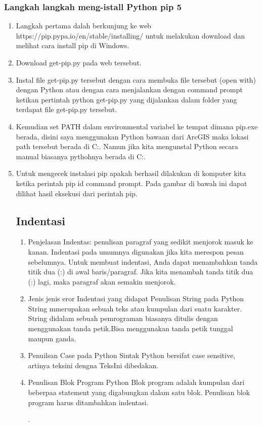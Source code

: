 \subsubsection{Langkah langkah meng-istall Python pip 5}
\begin{enumerate}
    \item Langkah pertama dalah berkunjung ke web 
https://pip.pypa.io/en/stable/installing/ untuk melakukan download dan melihat cara install pip di Windows.
    \item Download get-pip.py pada web tersebut.
    \item Instal file get-pip.py tersebut dengan cara membuka file tersebut (open with) dengan Python atau dengan cara menjalankan dengan command prompt ketikan pertintah python get-pip.py yang dijalankan dalam folder yang terdapat file get-pip.py tersebut.
    \item Kemudian set PATH dalam environmental variabel ke tempat dimana
     pip.exe
    berada, disini saya menggunakan Python bawaan dari ArcGIS maka lokasi path tersebut berada di 
    C:\Scripts.
    Namun jika kita mengunstal Python secara manual biasanya pythohnya berada di C:\Scripts.
    \item Untuk mengecek instalasi pip apakah berhasil dilakukan di komputer kita ketika perintah pip id command prompt. Pada gambar di bawah ini dapat dilihat hasil eksekusi dari perintah pip.
\subsection{Indentasi}
     \begin{enumerate}
         \item Penjelasan Indentas:
     penulisan paragraf yang sedikit menjorok masuk ke kanan. Indentasi pada umumnya digunakan jika kita merespon pesan sebelumnya. Untuk membuat indentasi, Anda dapat menambahkan tanda titik dua (:) di awal baris/paragraf. Jika kita menambah tanda titik dua (:) lagi, maka paragraf akan semakin menjorok.
     \item Jenis jenis eror Indentasi yang didapat
Penulisan String pada Python
String mmerupakan sebuah teks atau kumpulan dari suatu karakter.
String didalam sebuah pemrograman biasanya ditulis dengan menggunakan tanda petik.Bisa menggunakan tanda petik tunggal maupun ganda.
    \item Penuilsan Case pada Python
Sintak Python bersifat case sensitive, artinya teksini dengna TeksIni dibedakan.
     \item  Penulisan Blok Program Python
Blok program adalah kumpulan dari beberpaa statement yang digabungkan dalam satu blok.
Penulisan blok program harus ditambahkan indentasi.

.





    
     \end{enumerate}
     

\end{enumerate}
    
  